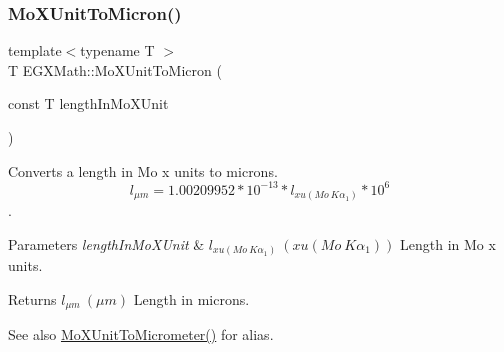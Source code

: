\subsubsection{\texorpdfstring{Mo\+X\+Unit\+To\+Micron()}{MoXUnitToMicron()}}
{\footnotesize\ttfamily template$<$typename T $>$ \\
T E\+G\+X\+Math\+::\+Mo\+X\+Unit\+To\+Micron (\begin{DoxyParamCaption}\item[{const T}]{length\+In\+Mo\+X\+Unit }\end{DoxyParamCaption})}



Converts a length in Mo x units to microns. \[ l_{\mu m}=1.00209952*10^{-13} * l_{xu(Mo\ K\alpha_1)} * 10^{6} \]. 


\begin{DoxyParams}{Parameters}
{\em length\+In\+Mo\+X\+Unit} & $ l_{xu(Mo\ K\alpha_1)}\ (xu(Mo\ K\alpha_1))$ Length in Mo x units. \\
\hline
\end{DoxyParams}
\begin{DoxyReturn}{Returns}
$ l_{\mu m}\ (\mu m)$ Length in microns. 
\end{DoxyReturn}
\begin{DoxySeeAlso}{See also}
\mbox{\hyperlink{group___e_g_x_math-_conversions-_length_conversions-_non-_s_i-_mo_x_unit-_s_i_ga1608daf69fda5b90eabc5f8d47831f18}{Mo\+X\+Unit\+To\+Micrometer()}} for alias. 
\end{DoxySeeAlso}
